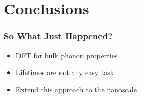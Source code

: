 \documentclass[]{beamer}
\begin{document}
\section{Conclusions}

\begin{frame}
  \frametitle{So What Just Happened?}   %
 \begin{itemize}
  \item DFT for bulk phonon properties
  \item Lifetimes are not any easy task
  \item Extend this approach to the nanoscale
 \end{itemize}
\end{frame}

\end{document}
